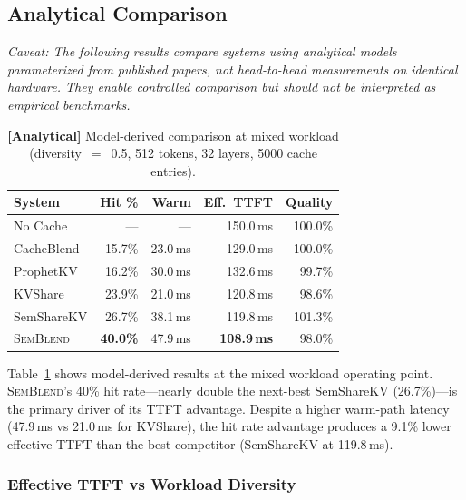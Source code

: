 \documentclass[11pt,twocolumn]{article}
\newcommand{\semblend}{\textsc{SemBlend}\xspace}
\begin{document}
\subsection{Analytical Comparison}
\label{sec:analytical-comparison}

\emph{Caveat: The following results compare systems using analytical
models parameterized from published papers, not head-to-head
measurements on identical hardware. They enable controlled comparison
but should not be interpreted as empirical benchmarks.}

\begin{table}[t]
\centering
\caption{\textbf{[Analytical]} Model-derived comparison at mixed workload
(diversity~$=$~0.5, 512 tokens, 32 layers, 5000 cache entries).}
\label{tab:headtohead}
\footnotesize
\setlength{\tabcolsep}{3pt}
\begin{tabular}{lrrrr}
\toprule
\textbf{System} & \textbf{Hit \%} & \textbf{Warm} & \textbf{Eff.\ TTFT} & \textbf{Quality} \\
\midrule
No Cache & --- & --- & 150.0\,ms & 100.0\% \\
CacheBlend & 15.7\% & 23.0\,ms & 129.0\,ms & 100.0\% \\
ProphetKV & 16.2\% & 30.0\,ms & 132.6\,ms & 99.7\% \\
KVShare & 23.9\% & 21.0\,ms & 120.8\,ms & 98.6\% \\
SemShareKV & 26.7\% & 38.1\,ms & 119.8\,ms & 101.3\% \\
\midrule
\semblend & \textbf{40.0\%} & 47.9\,ms & \textbf{108.9\,ms} & 98.0\% \\
\bottomrule
\end{tabular}
\end{table}

Table~\ref{tab:headtohead} shows model-derived results at the mixed
workload operating point. \semblend's 40\% hit rate---nearly double the
next-best SemShareKV (26.7\%)---is the primary driver of its TTFT
advantage. Despite a higher warm-path latency (47.9\,ms vs 21.0\,ms for
KVShare), the hit rate advantage produces a 9.1\% lower effective TTFT
than the best competitor (SemShareKV at 119.8\,ms).


\subsubsection{Effective TTFT vs Workload Diversity}
\end{document}
